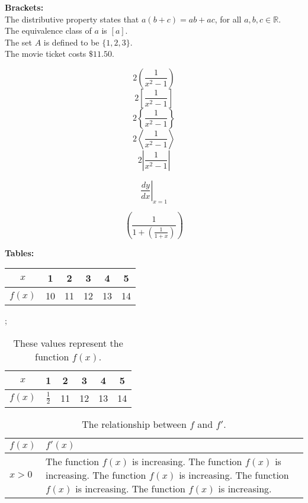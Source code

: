 \documentclass[11pt]{article}
\begin{document}
{\Large\bf Brackets:}\\
The distributive property states that $a(b+c)=ab+ac$, for all $a, b, c \in \mathbb{R}$. \\[6pt]
The equivalence class of $a$ is $[a]$.\\[6pt]
The set $A$ is defined to be $\{1, 2, 3\}$.\\[6pt]
The movie ticket costs $\$11.50$. 

$$2\left(\frac{1}{x^2-1}\right)$$
$$2\left[\frac{1}{x^2-1}\right]$$
$$2\left\{\frac{1}{x^2-1}\right\}$$
$$2\left \langle      \frac{1}{x^2-1}\right \rangle      $$
$$2\left | \frac{1}{x^2-1}\right |      $$

$$\left.\frac{dy}{dx}\right|_{x=1}$$

$$\left( \frac{1}{1+\left(\frac{1}{1+x}\right)} \right)$$

\newpage









{\Large\bf Tables:}\\

\begin{tabular}{|c||c|c|c|c|c|}
\hline
$x$ & 1 & 2 & 3 & 4 & 5 \\ \hline
$f(x)$ & 10 & 11 & 12 & 13 & 14 \\ \hline
\end{tabular}

\vspace{1cm}
;

\begin{table}[H]
\centering
\def\arraystretch{1.5} %
\begin{tabular}{|c||c|c|c|c|c|}
\hline
$x$ & 1 & 2 & 3 & 4 & 5 \\ \hline
$f(x)$ & $\frac{1}{2}$ & 11 & 12 & 13 & 14 \\ \hline
\end{tabular}
\caption{These values represent the function $f(x)$.}
\end{table}


\lipsum[1]\vspace{4cm}
\begin{table}[H]
    \centering
    \caption{The relationship between $f$ and $f'$.}
    \begin{tabular}{|l|p{3in}|}
    \hline
    $f(x)$ & $f'(x)$ \\ \hline
    $x>0$ & The function $f(x)$ is increasing. The function $f(x)$ is increasing. The function $f(x)$ is increasing. The function $f(x)$ is increasing. The function $f(x)$ is increasing. \\ \hline
    \end{tabular}
\end{table}
\end{document}
